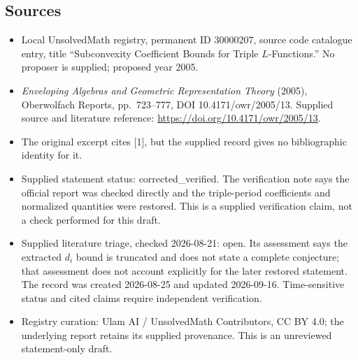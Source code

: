 \documentclass[11pt]{article}
\begin{document}
\subsection{Sources}
\begin{itemize}
\item Local UnsolvedMath registry, permanent ID 30000207, source code catalogue entry, title ``Subconvexity Coefficient Bounds for Triple $L$-Functions.'' No proposer is supplied; proposed year 2005.
\item \emph{Enveloping Algebras and Geometric Representation Theory} (2005), Oberwolfach Reports, pp.\ 723--777, DOI 10.4171/owr/2005/13. Supplied source and literature reference: \url{https://doi.org/10.4171/owr/2005/13}.
\item The original excerpt cites [1], but the supplied record gives no bibliographic identity for it.
\item Supplied statement status: corrected\_verified. The verification note says the official report was checked directly and the triple-period coefficients and normalized quantities were restored. This is a supplied verification claim, not a check performed for this draft.
\item Supplied literature triage, checked 2026-08-21: open. Its assessment says the extracted $d_i$ bound is truncated and does not state a complete conjecture; that assessment does not account explicitly for the later restored statement. The record was created 2026-08-25 and updated 2026-09-16. Time-sensitive status and cited claims require independent verification.
\item Registry curation: Ulam AI / UnsolvedMath Contributors, CC BY 4.0; the underlying report retains its supplied provenance. This is an unreviewed statement-only draft.
\end{itemize}
\end{document}
